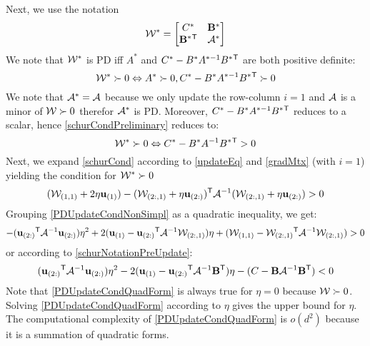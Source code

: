 Next, we use the notation
\begin{equation}
\mathcal{W^*}= \left[ \begin{matrix} C^* & \mathbf{B^*} \\ \mathbf{B^*{}^\mathsf{T}} & \mathcal{A^*} \end{matrix} \right]
\end{equation}
We note that $\mathcal{W^*}$ is PD iff $A^*$ and $C^* - B^* A^{*-1} B^*{}^\mathsf{T}$ are both positive definite:
\begin{equation}
\mathcal{W^*} \succ  0 \Leftrightarrow A^* \succ  0, C^* - B^* A^{*-1} B^*{}^\mathsf{T} \succ  0
\label{schurCondPreliminary}
\end{equation}
We note that $\mathcal{A^*} = \mathcal{A}$ because we only update the row-column $i=1$ and $\mathcal{A}$ is a minor of $\mathcal{W} \succ  0$ therefor $\mathcal{A^*}$ is PD. Moreover, $C^* - B^* A^{*-1} B^*{}^\mathsf{T}$ reduces to a scalar, hence \eqref{schurCondPreliminary} reduces to:
\begin{equation}
\mathcal{W^*} \succ  0 \Leftrightarrow C^* - B^* A^{-1} B^*{}^\mathsf{T} >  0
\label{schurCond}
\end{equation}
Next, we expand \eqref{schurCond} according to \eqref{updateEq} and \eqref{gradMtx} (with $i=1$) yielding the condition for ${\mathcal{W^*}} \succ  0$
\begin{equation}
(\mathcal{W}_{(1,1)} + 2\eta \mathbf{u}_{(1)}) - (\mathcal{W}_{(2:,1)} + \eta \mathbf{u}_{(2:)}){}^\mathsf{T} \mathcal{A}^{-1} (\mathcal{W}_{(2:,1)} + \eta \mathbf{u}_{(2:)}) >  0
\label{PDUpdateCondNonSimpl}
\end{equation}
Grouping \eqref{PDUpdateCondNonSimpl} as a quadratic inequality, we get:
\begin{equation}
-(\mathbf{u}_{(2:)}{}^\mathsf{T} \mathcal{A}^{-1} \mathbf{u}_{(2:)})\eta^2+ 2(\mathbf{u}_{(1)} - \mathbf{u}_{(2:)}{}^\mathsf{T} \mathcal{A}^{-1}\mathcal{W}_{(2:,1)})\eta +  (\mathcal{W}_{(1,1)} - \mathcal{W}_{(2:,1)}{}^\mathsf{T}  \mathcal{A}^{-1} \mathcal{W}_{(2:,1)}) > 0
\label{PDUpdateCondQuadFormWithW}
\end{equation}
or according to \eqref{schurNotationPreUpdate}:
\begin{equation}
(\mathbf{u}_{(2:)}{}^\mathsf{T} \mathcal{A}^{-1} \mathbf{u}_{(2:)}) \eta^2 - 2(\mathbf{u}_{(1)} - \mathbf{u}_{(2:)}{}^\mathsf{T} \mathcal{A}^{-1}\mathbf{B{}^\mathsf{T}})\eta -  (C - \mathbf{B}  \mathcal{A}^{-1} \mathbf{B}{}^\mathsf{T}) < 0
\label{PDUpdateCondQuadForm}
\end{equation}
Note that \eqref{PDUpdateCondQuadForm} is always true for $\eta = 0$ because $\mathcal{W}\succ0$. Solving \eqref{PDUpdateCondQuadForm} according to $\eta$ gives the upper bound for $\eta$.  The computational complexity of \eqref{PDUpdateCondQuadForm} is $o(d^2)$ because it is a summation of quadratic forms. 

